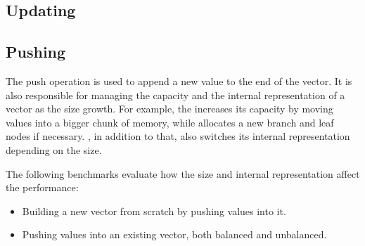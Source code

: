 \begin{figure}
\end{figure}


\subsection{Updating}

\subsection{Pushing}

The push operation is used to append a new value to the end of the vector. It is also responsible for managing the capacity and the internal representation of a vector as the size growth. For example, the \stdvec{} increases its capacity by moving values into a bigger chunk of memory, while \rrbvec{} allocates a new branch and leaf nodes if necessary. \pvec{}, in addition to that, also switches its internal representation depending on the size.

The following benchmarks evaluate how the size and internal representation affect the performance:

\begin{itemize}
    \item Building a new vector from scratch by pushing values into it. 
    \item Pushing values into an existing vector, both balanced and unbalanced. 
\end{itemize}

